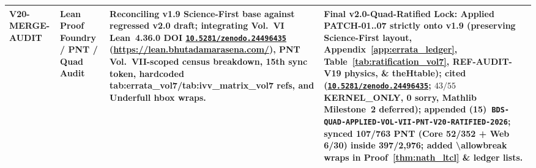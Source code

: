 \documentclass[11pt,a4paper,reqno]{article}
\def\texttt#1{#1}%
\theoremstyle{plain}
\theoremstyle{definition}
\theoremstyle{remark}
\numberwithin{equation}{section}
\numberwithin{table}{section}
\providecommand{\zenodo}[1]{\href{https://doi.org/10.5281/zenodo.#1}{\nolinkurl{10.5281/zenodo.#1}}}
\begin{document}
\begin{longtable}{@{} P{2.65cm} P{2.45cm} P{4.10cm} P{\dimexpr\textwidth-9.2cm-6\tabcolsep\relax} @{}}
\texttt{V20-\allowbreak MERGE-\allowbreak AUDIT} & Lean Proof Foundry / PNT / Quad Audit & Reconciling \texttt{v1.9} Science-First base against regressed \texttt{v2.0} draft; integrating Vol.~VI Lean~4.36.0 DOI \zenodo{24496435} (\url{https://lean.bhutadamarasena.com/}), PNT Vol.~VII-scoped census breakdown, 15th sync token, hardcoded \texttt{tab:\allowbreak errata\_\allowbreak vol7}/\texttt{tab:\allowbreak ivv\_\allowbreak matrix\_\allowbreak vol7} refs, and Underfull \texttt{hbox} wraps. & \textbf{Final \texttt{v2.0-Quad-Ratified} Lock:} Applied \texttt{PATCH-01..07} strictly onto \texttt{v1.9} (preserving Science-First layout, Appendix~\ref{app:errata_ledger}, Table~\ref{tab:ratification_vol7}, \texttt{REF-AUDIT-V19} physics, \& \texttt{theHtable}); cited \cite{AppliedPuristVol6Lean2026} (\zenodo{24496435}; $43/55$ \texttt{KERNEL\_ONLY}, 0 sorry, Mathlib Milestone~2 deferred); appended (15)~\nolinkurl{BDS-QUAD-APPLIED-VOL-VII-PNT-V20-RATIFIED-2026}; synced \texttt{107/763} PNT (Core \texttt{52/352} + Web \texttt{6/30}) inside \texttt{397/2,976}; added \texttt{\textbackslash allowbreak} wraps in Proof~\ref{thm:nath_ltcl} \& ledger lists. \\
\bottomrule
\end{longtable}
\normalsize
\setlength{\tabcolsep}{3pt}
\end{document}
